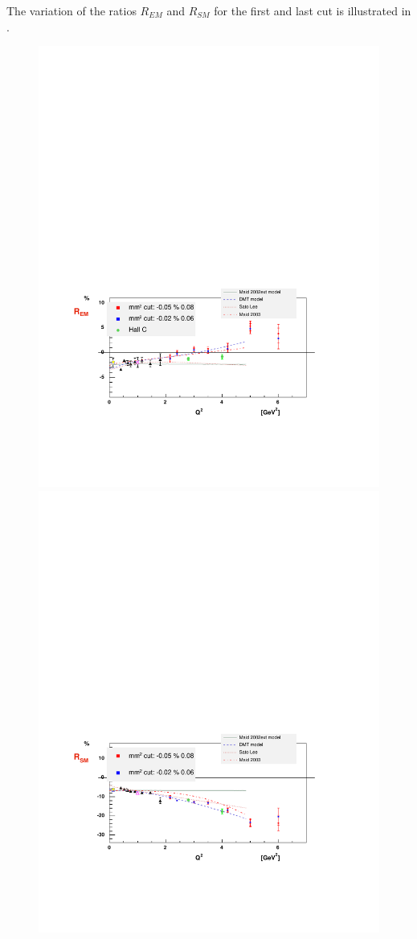 The variation of the ratios $R_{EM}$ and $R_{SM}$ for the first and last cut is illustrated in 
.
\begin{figure}[h]
 \begin{center}
  \includegraphics[width = 12cm, bb = 50 120 540 440]{systematics/img/rem_mmsyst}
  \includegraphics[width = 12cm, bb = 50 100 540 440]{systematics/img/rsm_mmsyst}

\end{center}
\end{figure}
